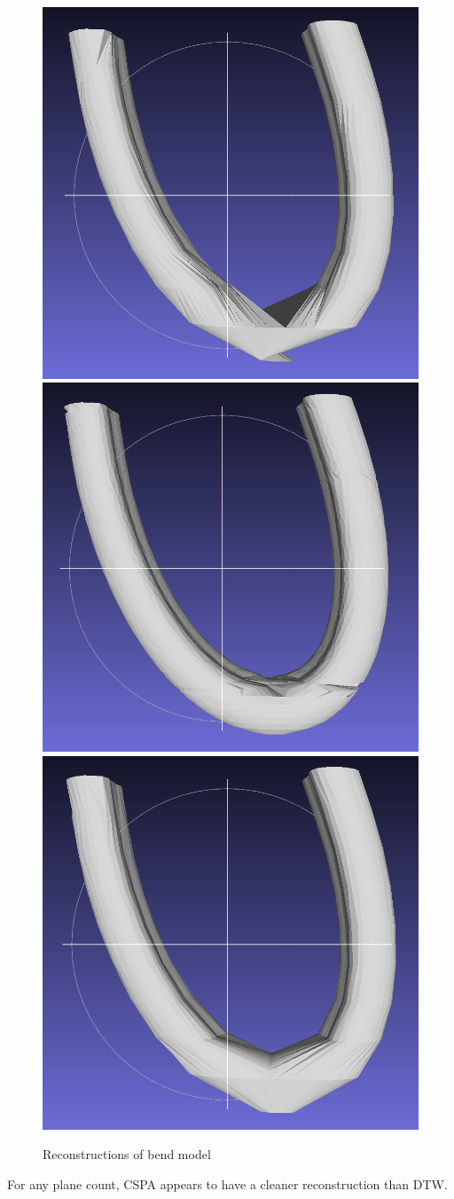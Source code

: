 \documentclass[11p, titlepage]{article}
\newcommand{\reconstructionright}{0.67}
\begin{document}
\begin{figure}[h!]
\begin{minipage}[b]{\reconstructionright\linewidth}
       \hfill
       {\includegraphics[width=.48\linewidth]{reconstructions/dtw-bend-10}}
       \hfill
       {\includegraphics[width=.48\linewidth]{reconstructions/cspa50-bend-50}}%
       \hfill
       {\includegraphics[width=.48\linewidth]{reconstructions/cspa50-bend-10}}
     \end{minipage}%
        \caption{Reconstructions of bend model}
        \label{fig:bend_reconstructions}
\end{figure}

For any plane count, CSPA appears to have a cleaner reconstruction than DTW.
\end{document}
